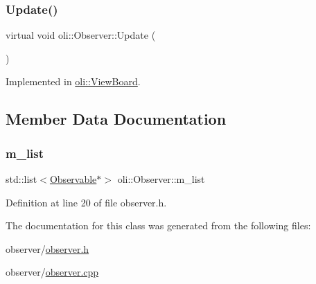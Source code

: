\subsubsection{\texorpdfstring{Update()}{Update()}}
{\footnotesize\ttfamily virtual void oli\+::\+Observer\+::\+Update (\begin{DoxyParamCaption}{ }\end{DoxyParamCaption})\hspace{0.3cm}{\ttfamily [pure virtual]}}



Implemented in \hyperlink{classoli_1_1_view_board_a487ea5886ec5de0422fc6e060aa7045b}{oli\+::\+View\+Board}.



\subsection{Member Data Documentation}
\hypertarget{classoli_1_1_observer_acf615598b1c72e779d12c8b9b9422c86}{}\label{classoli_1_1_observer_acf615598b1c72e779d12c8b9b9422c86} 
\subsubsection{\texorpdfstring{m\+\_\+list}{m\_list}}
{\footnotesize\ttfamily std\+::list$<$\hyperlink{classoli_1_1_observable}{Observable}$\ast$$>$ oli\+::\+Observer\+::m\+\_\+list\hspace{0.3cm}{\ttfamily [protected]}}



Definition at line 20 of file observer.\+h.



The documentation for this class was generated from the following files\+:\begin{DoxyCompactItemize}
\item 
observer/\hyperlink{observer_8h}{observer.\+h}\item 
observer/\hyperlink{observer_8cpp}{observer.\+cpp}\end{DoxyCompactItemize}
